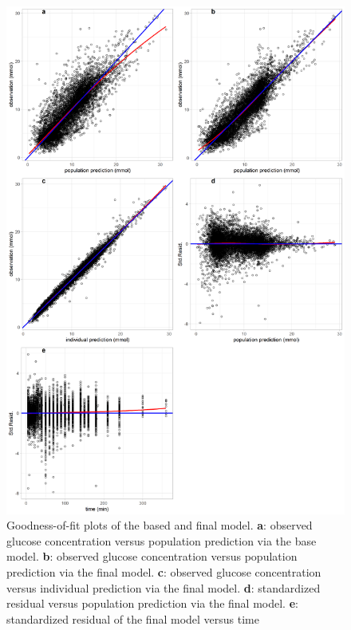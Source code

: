 \documentclass[utf8]{frontiersSCNS} %
\begin{document}
\begin{figure}[h!]
\begin{center}
\includegraphics[width=14cm]{comb.PNG}
\end{center}
\caption{Goodness-of-fit plots of the based and final model. \textbf{a}: observed glucose concentration versus population prediction via the base model.  \textbf{b}: observed glucose concentration versus population prediction via the final model. \textbf{c}: observed glucose concentration versus individual prediction via the final model. \textbf{d}: standardized residual versus population prediction via the final model. \textbf{e}: standardized residual of the final model versus time}
\label{fig: fittings}
\end{figure}
\end{document}
